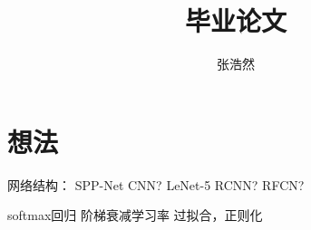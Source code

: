 \documentclass{article}
\title{毕业论文}
\author{张浩然}
\date{}
\begin{document}

\maketitle

\section{想法}
网络结构：
    SPP-Net
    CNN?
        LeNet-5
    RCNN?
    RFCN?

softmax回归
阶梯衰减学习率
过拟合，正则化


\cite{name1}


\end{document}
